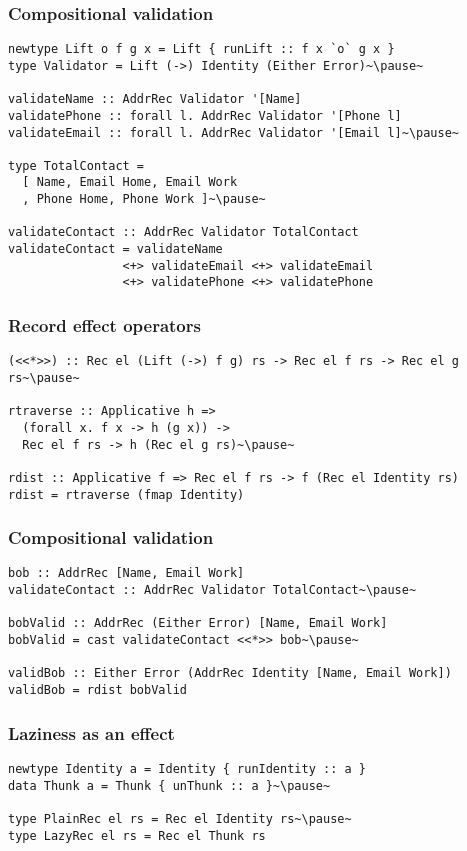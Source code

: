 \documentclass[tikz, 12pt]{beamer}
\begin{document}
\begin{frame}[fragile]
  \frametitle{Compositional validation}
  \begin{lstlisting}
newtype Lift o f g x = Lift { runLift :: f x `o` g x }
type Validator = Lift (->) Identity (Either Error)~\pause~

validateName :: AddrRec Validator '[Name]
validatePhone :: forall l. AddrRec Validator '[Phone l]
validateEmail :: forall l. AddrRec Validator '[Email l]~\pause~

type TotalContact =
  [ Name, Email Home, Email Work
  , Phone Home, Phone Work ]~\pause~

validateContact :: AddrRec Validator TotalContact
validateContact = validateName
                <+> validateEmail <+> validateEmail
                <+> validatePhone <+> validatePhone
  \end{lstlisting}
\end{frame}

\begin{frame}[fragile]
  \frametitle{Record effect operators}\pause
  \begin{lstlisting}
(<<*>>) :: Rec el (Lift (->) f g) rs -> Rec el f rs -> Rec el g rs~\pause~

rtraverse :: Applicative h =>
  (forall x. f x -> h (g x)) ->
  Rec el f rs -> h (Rec el g rs)~\pause~

rdist :: Applicative f => Rec el f rs -> f (Rec el Identity rs)
rdist = rtraverse (fmap Identity)
  \end{lstlisting}
\end{frame}

\begin{frame}[fragile]
  \frametitle{Compositional validation}
  \begin{lstlisting}
bob :: AddrRec [Name, Email Work]
validateContact :: AddrRec Validator TotalContact~\pause~

bobValid :: AddrRec (Either Error) [Name, Email Work]
bobValid = cast validateContact <<*>> bob~\pause~

validBob :: Either Error (AddrRec Identity [Name, Email Work])
validBob = rdist bobValid
  \end{lstlisting}
\end{frame}

\begin{frame}[fragile]
  \frametitle{Laziness as an effect}\pause

  \begin{lstlisting}
newtype Identity a = Identity { runIdentity :: a }
data Thunk a = Thunk { unThunk :: a }~\pause~

type PlainRec el rs = Rec el Identity rs~\pause~
type LazyRec el rs = Rec el Thunk rs
  \end{lstlisting}
\end{frame}
\end{document}
